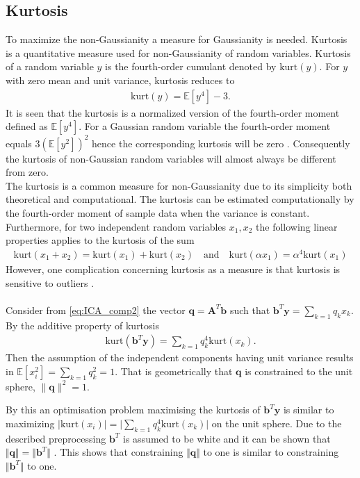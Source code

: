 \subsection{Kurtosis}
To maximize the non-Gaussianity a measure for Gaussianity is needed. Kurtosis is a quantitative measure used for non-Gaussianity of random variables\cite[p.171]{ICA}. 
Kurtosis of a random variable $y$ is the fourth-order cumulant denoted by $\text{kurt}(y)$. 
For $y$ with zero mean and unit variance, kurtosis reduces to 
\begin{align*}
\text{kurt} (y) = \mathbb{E}[y^4] - 3.
\end{align*} 
It is seen that the kurtosis is a normalized version of the fourth-order moment defined as $\mathbb{E}[y^4]$. 
For a Gaussian random variable the fourth-order moment equals $3(\mathbb{E}[y^2])^2$ hence the corresponding kurtosis will be zero \cite[p. 171]{ICA}. 
Consequently the kurtosis of non-Gaussian random variables will almost always be different from zero.
\\
The kurtosis is a common measure for non-Gaussianity due to its simplicity  both theoretical and computational. 
The kurtosis can be estimated computationally by the fourth-order moment of sample data when the variance is constant.
Furthermore, for two independent random variables $x_1, x_2$ the following linear properties applies to the kurtosis of the sum
\begin{align*}
\text{kurt}(x_1 + x_2)=\text{kurt}(x_1)+ \text{kurt}(x_2) \quad \text{and} \quad \text{kurt}(\alpha x_1) = \alpha^4 \text{kurt}(x_1)
\end{align*}  
However, one complication concerning kurtosis as a measure is that kurtosis is sensitive to outliers \cite[p. 182]{ICA}.
\\ \\      
Consider from \eqref{eq:ICA_comp2} the vector $\textbf{q} = \textbf{A}^T\textbf{b}$ such that $\textbf{b}^T \textbf{y} = \sum_{k=1} q_k x_k$. 
By the additive property of kurtosis
\begin{align*}
\text{kurt} \left( \textbf{b}^T\textbf{y} \right) = \sum_{k=1}q_k^4 \text{kurt}(x_k).
\end{align*}
Then the assumption of the independent components having unit variance results in $\mathbb{E}[x_i^2]= \sum_{k=1}q_k^2=1$. 
That is geometrically that $\textbf{q}$ is constrained to the unit sphere, $\| \textbf{q}\|^2 = 1$. 

By this an optimisation problem maximising the kurtosis of $\textbf{b}^T \textbf{y}$ is similar to maximizing $\vert \text{kurt}(x_i)\vert = \vert \sum_{k=1}q_k^4 \text{kurt}(x_k) \vert $ on the unit sphere.
Due to the described preprocessing $\textbf{b}^T$ is assumed to be white and it can be shown that $\Vert \textbf{q} \Vert = \Vert \textbf{b}^T \Vert$ \cite[p. 174]{ICA}. 
This shows that constraining $\Vert \textbf{q} \Vert$ to one is similar to constraining $\Vert \textbf{b}^T \Vert$ to one. 

